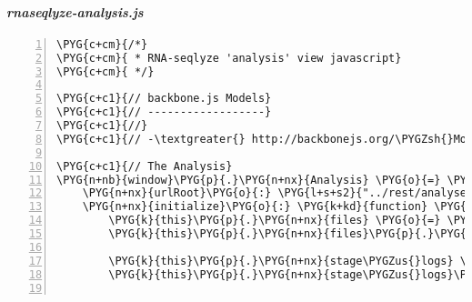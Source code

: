 \paragraph{\emph{rnaseqlyze-analysis.js}}
\label{rnaseqlyze-pdf:rnaseqlyze-analysis-js}
\begin{Verbatim}[commandchars=\\\{\},numbers=left,firstnumber=1,stepnumber=5]
\PYG{c+cm}{/*}
\PYG{c+cm}{ * RNA-seqlyze 'analysis' view javascript}
\PYG{c+cm}{ */}

\PYG{c+c1}{// backbone.js Models}
\PYG{c+c1}{// ------------------}
\PYG{c+c1}{//}
\PYG{c+c1}{// -\textgreater{} http://backbonejs.org/\PYGZsh{}Model}

\PYG{c+c1}{// The Analysis}
\PYG{n+nb}{window}\PYG{p}{.}\PYG{n+nx}{Analysis} \PYG{o}{=} \PYG{n+nx}{Backbone}\PYG{p}{.}\PYG{n+nx}{Model}\PYG{p}{.}\PYG{n+nx}{extend}\PYG{p}{(}\PYG{p}{\PYGZob{}}
    \PYG{n+nx}{urlRoot}\PYG{o}{:} \PYG{l+s+s2}{"../rest/analyses"}\PYG{p}{,}
    \PYG{n+nx}{initialize}\PYG{o}{:} \PYG{k+kd}{function} \PYG{p}{(}\PYG{p}{)} \PYG{p}{\PYGZob{}}
        \PYG{k}{this}\PYG{p}{.}\PYG{n+nx}{files} \PYG{o}{=} \PYG{k}{new} \PYG{n+nx}{DataDirListing}\PYG{p}{(}\PYG{p}{)}\PYG{p}{;}
        \PYG{k}{this}\PYG{p}{.}\PYG{n+nx}{files}\PYG{p}{.}\PYG{n+nx}{analysis} \PYG{o}{=} \PYG{k}{this}\PYG{p}{;}

        \PYG{k}{this}\PYG{p}{.}\PYG{n+nx}{stage\PYGZus{}logs} \PYG{o}{=} \PYG{k}{new} \PYG{n+nx}{StageLogList}\PYG{p}{(}\PYG{p}{)}\PYG{p}{;}
        \PYG{k}{this}\PYG{p}{.}\PYG{n+nx}{stage\PYGZus{}logs}\PYG{p}{.}\PYG{n+nx}{analysis} \PYG{o}{=} \PYG{k}{this}\PYG{p}{;}


\end{Verbatim}
